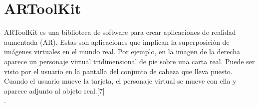 \section{ARToolKit}
ARToolKit es una biblioteca de software para crear aplicaciones de realidad aumentada (AR). Estas son aplicaciones que implican la superposición de imágenes virtuales en el mundo real. Por ejemplo, en la imagen de la derecha aparece un personaje virtual tridimensional de pie sobre una carta real. Puede ser visto por el usuario en la pantalla del conjunto de cabeza que lleva puesto. Cuando el usuario mueve la tarjeta, el personaje virtual se mueve con ella y aparece adjunto al objeto real.[7]\\.\par 

